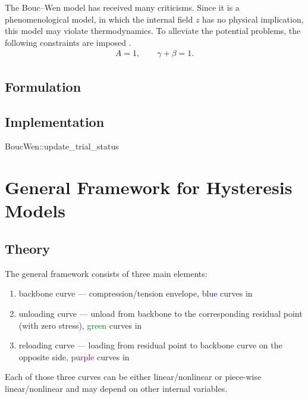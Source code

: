 The Bouc--Wen model has received many criticisms. Since it is a phenomenological model, in which the internal field $z$ has no physical implication, this model may violate thermodynamics.
To alleviate the potential problems, the following constraints are imposed \cite{Ma2004}.
\begin{gather}
A=1,\qquad\gamma+\beta=1.
\end{gather}
\subsection{Formulation}
\subsection{Implementation}
\begin{cppcode}
BoucWen::update_trial_status
\end{cppcode}
\section{General Framework for Hysteresis Models}
\subsection{Theory}
The general framework consists of three main elements:
\begin{enumerate}
\item backbone curve --- compression/tension envelope, \textcolor{blue}{blue} curves in 
\item unloading curve --- unload from backbone to the corresponding residual point (with zero stress), \textcolor{green}{green} curves in 
\item reloading curve --- loading from residual point to backbone curve on the opposite side, \textcolor{purple}{purple} curves in 
\end{enumerate}
Each of those three curves can be either linear/nonlinear or piece-wise linear/nonlinear and may depend on other internal variables.

